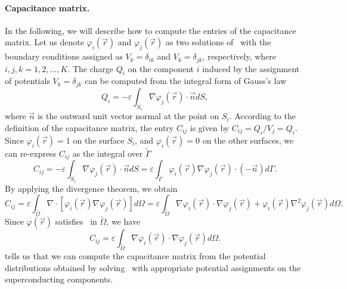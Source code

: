 \documentclass[a4paper,onecolumn,11pt,unpublished]{quantumarticle}
\begin{document}
\paragraph{Capacitance matrix.}In the following, we will describe how to compute the entries of the capacitance matrix. Let us denote $\varphi_i\left(\vec{r}\right)$ and $\varphi_j\left(\vec{r}\right)$ as two solutions of~ with the boundary conditions assigned as $V_{k}=\delta_{ik}$ and $V_{k}=\delta_{jk}$, respectively, where $i,j,k=1,2,\ldots,K$. The charge $Q_i$ on the component $i$ induced by the assignment of potentials $V_{k}=\delta_{jk}$ can be computed from the integral form of Gauss's law
\begin{equation}
    Q_{i}=-\varepsilon\int_{S_{i}}\nabla\varphi_{j}\left(\vec{r}\right)\cdot\vec{n}dS,
\end{equation}
where $\vec{n}$ is the outward unit vector normal at the point on $S_i$. According to the definition of the capacitance matrix, the entry $C_{ij}$ is given by $C_{ij} = Q_{i}/V_j = Q_i$. Since $\varphi_{i}\left(\vec{r}\right)=1$ on the surface $S_i$, and $\varphi_{i}\left(\vec{r}\right)=0$ on the other surfaces, we can re-express $C_{ij}$ as the integral over $\tilde{\Gamma}$
\begin{equation}
    C_{ij}=-\varepsilon\int_{S_{i}}\nabla\varphi_{j}\left(\vec{r}\right)\cdot\vec{n}dS
    =\varepsilon\int_{\tilde{\Gamma}}\varphi_{i}\left(\vec{r}\right)\nabla\varphi_{j}\left(\vec{r}\right)\cdot\left(-\vec{n}\right)d\Gamma .
\end{equation}
By applying the divergence theorem, we obtain
\begin{equation}
C_{ij}=\varepsilon\int_{\tilde{\Omega}}\nabla\cdot\left[\varphi_{i}\left(\vec{r}\right)\nabla\varphi_{j}\left(\vec{r}\right)\right]d\Omega
=\varepsilon\int_{\tilde{\Omega}}\nabla\varphi_{i}\left(\vec{r}\right)\cdot\nabla\varphi_{j}\left(\vec{r}\right)
+\varphi_{i}\left(\vec{r}\right)\nabla^{2}\varphi_{j}\left(\vec{r}\right)d\Omega.
\end{equation}
Since $\varphi\left(\vec{r}\right)$ satisfies~ in $\tilde{\Omega}$, we have
\begin{equation}
C_{ij}=\varepsilon\int_{\tilde{\Omega}}\nabla\varphi_{i}\left(\vec{r}\right)\cdot\nabla\varphi_{j}\left(\vec{r}\right)d\Omega.
\label{eq:capacitance_matrix}
\end{equation}
 tells us that we can compute the capacitance matrix from the potential distributions obtained by solving~ with appropriate potential assignments on the superconducting components.
\end{document}
